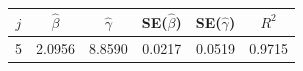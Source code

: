 \begin{tabular}{cccccc}
\toprule
$j$ & $\hat{\beta}$ & $\hat{\gamma}$ & SE($\hat{\beta}$) & SE($\hat{\gamma}$) & $R^2$ \\
\midrule
5 & 2.0956 & 8.8590 & 0.0217 & 0.0519 & 0.9715 \\
\bottomrule
\end{tabular}